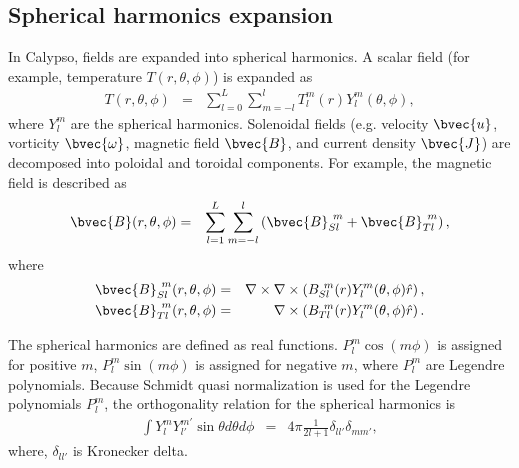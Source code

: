 \subsection{Spherical harmonics expansion}
In Calypso, fields are expanded into spherical harmonics. A scalar field (for example, temperature $T(r, \theta, \phi)$) is expanded as
%
\begin{eqnarray}
T(r, \theta, \phi) &=& \sum_{l=0}^{L} \sum_{m=-l}^{l} T_{l}^{m}(r) Y_{l}^{m}(\theta,\phi),
\nonumber
\end{eqnarray}
where  $Y_{l}^{m}$ are the spherical harmonics. Solenoidal fields (e.g. velocity $\bvec{u}$, vorticity $\bvec{\omega}$, magnetic field $\bvec{B}$, and current density $\bvec{J}$) are decomposed into poloidal and toroidal components. For example, the magnetic field is described as 
\begin{eqnarray}
\bvec{B}(r, \theta, \phi) & = & \sum_{l=1}^{L} \sum_{m=-l}^{l} 
\left( \bvec{B}_{Sl}^{\ m} + \bvec{B}_{Tl}^{\ m} \right),\nonumber
\end{eqnarray}
where
\begin{eqnarray}
\bvec{B}_{Sl}^{\ m}(r, \theta, \phi) & = & \nabla \times \nabla \times \left( B_{Sl}^{\ m}(r) Y_{l}^{m}(\theta,\phi) \hat{r} \right),
\nonumber \\
\bvec{B}_{Tl}^{\ m}(r, \theta, \phi) & = & \nabla \times \left( B_{Tl}^{\ m}(r) Y_{l}^{m}(\theta,\phi) \hat{r} \right).
\nonumber
\end{eqnarray}

The spherical harmonics are defined as real functions. $P_{l}^{m} \cos \left( m\phi \right)$ is assigned for positive $m$, $P_{l}^{m} \sin \left( m\phi \right)$ is assigned for negative $m$, where $P_{l}^{m}$ are Legendre polynomials. Because Schmidt quasi normalization is used for the Legendre polynomials $P_{l}^{m}$, the orthogonality relation for the spherical harmonics is 
%
\begin{eqnarray}
\int Y_{l}^{m} Y_{l'}^{m'} \sin \theta d\theta d\phi &=& 4\pi \frac{1}{2l+1} \delta_{ll'}\delta_{mm'},
\nonumber
\end{eqnarray}
%
where, $\delta_{ll'}$ is Kronecker delta.

